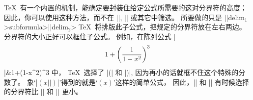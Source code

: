 \1\TeX\ 有一个内置的机制，能确定要封装住给定公式所需要的这对分界符的高度；
因此，你可以使用这种方法，而不在 |\big|, |\bigg| 或其它中筛选。%
所要做的只是
\begindisplay
|\left|\<delim$_1$>\<subformula>|\right|\<delim$_2$>
\enddisplay
 \TeX\ 将排版此子公式，把规定的分界符放在左右两边。%
分界符的大小正好可以框住子公式。%
例如，在陈列公式
\beginlongdisplaymathdemo
|$$1+\left(1\over1-x^2\right)^3$$|&1+\left(1-x^2\right)^3\cr
\endmathdemo
中， \TeX\ 选择了 |\biggl(| 和 |\biggr)|, 因为再小的话就框不住这个特殊的分数了。%
象`|$\left(x|\allowbreak|\right)$|'得到的就是`$\left(x\right)$'这样的简单公式，
因此，|\left| 和 |\right| 有时候选择的分界符比 |\bigl| 和 |\bigr| 更小。

